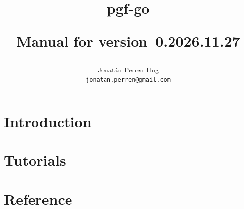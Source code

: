 \documentclass[a4paper,doc2]{ltxdoc}
\def\pgfgoversion{\leavevmode\hbox{0.2026.11.27}}
\begin{document}
	\title{\Huge\bfseries pgf-go\\[1em]
		\normalsize

		\begin{center}
			\begin{goban}[partial = B2:E3]


			\end{goban}
		\end{center}

		\large Manual for version~\pgfgoversion}
		\author{Jonat\'an Perren Hug\\
		\texttt{jonatan.perren@gmail.com}
		}

	\maketitle



	\label{table-of-contents}
	\tableofcontents

	\clearpage

	\part{Introduction}
	

	\part{Tutorials}\label{part:tutoriales}
	

	\part{Reference}\label{part:referencia}
	
	
	
	
	
	
	
	
	
	
	

	\appendix
	
\end{document}
